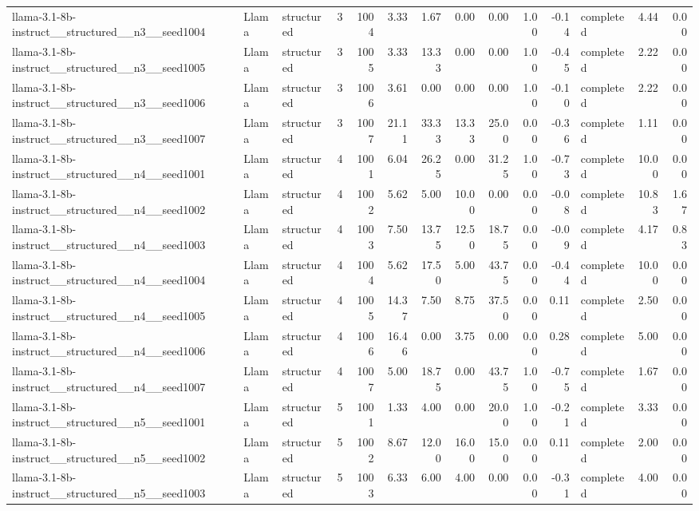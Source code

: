 \begin{longtable}{lllrrrrrrrrlrr}
llama-3.1-8b-instruct\_\_structured\_\_n3\_\_seed1004 & Llama & structured & 3 & 1004 & 3.33 & 1.67 & 0.00 & 0.00 & 1.00 & -0.14 & completed & 4.44 & 0.00 \\
llama-3.1-8b-instruct\_\_structured\_\_n3\_\_seed1005 & Llama & structured & 3 & 1005 & 3.33 & 13.33 & 0.00 & 0.00 & 1.00 & -0.45 & completed & 2.22 & 0.00 \\
llama-3.1-8b-instruct\_\_structured\_\_n3\_\_seed1006 & Llama & structured & 3 & 1006 & 3.61 & 0.00 & 0.00 & 0.00 & 1.00 & -0.10 & completed & 2.22 & 0.00 \\
llama-3.1-8b-instruct\_\_structured\_\_n3\_\_seed1007 & Llama & structured & 3 & 1007 & 21.11 & 33.33 & 13.33 & 25.00 & 0.00 & -0.36 & completed & 1.11 & 0.00 \\
llama-3.1-8b-instruct\_\_structured\_\_n4\_\_seed1001 & Llama & structured & 4 & 1001 & 6.04 & 26.25 & 0.00 & 31.25 & 1.00 & -0.73 & completed & 10.00 & 0.00 \\
llama-3.1-8b-instruct\_\_structured\_\_n4\_\_seed1002 & Llama & structured & 4 & 1002 & 5.62 & 5.00 & 10.00 & 0.00 & 0.00 & -0.08 & completed & 10.83 & 1.67 \\
llama-3.1-8b-instruct\_\_structured\_\_n4\_\_seed1003 & Llama & structured & 4 & 1003 & 7.50 & 13.75 & 12.50 & 18.75 & 0.00 & -0.09 & completed & 4.17 & 0.83 \\
llama-3.1-8b-instruct\_\_structured\_\_n4\_\_seed1004 & Llama & structured & 4 & 1004 & 5.62 & 17.50 & 5.00 & 43.75 & 0.00 & -0.44 & completed & 10.00 & 0.00 \\
llama-3.1-8b-instruct\_\_structured\_\_n4\_\_seed1005 & Llama & structured & 4 & 1005 & 14.37 & 7.50 & 8.75 & 37.50 & 0.00 & 0.11 & completed & 2.50 & 0.00 \\
llama-3.1-8b-instruct\_\_structured\_\_n4\_\_seed1006 & Llama & structured & 4 & 1006 & 16.46 & 0.00 & 3.75 & 0.00 & 0.00 & 0.28 & completed & 5.00 & 0.00 \\
llama-3.1-8b-instruct\_\_structured\_\_n4\_\_seed1007 & Llama & structured & 4 & 1007 & 5.00 & 18.75 & 0.00 & 43.75 & 1.00 & -0.75 & completed & 1.67 & 0.00 \\
llama-3.1-8b-instruct\_\_structured\_\_n5\_\_seed1001 & Llama & structured & 5 & 1001 & 1.33 & 4.00 & 0.00 & 20.00 & 1.00 & -0.21 & completed & 3.33 & 0.00 \\
llama-3.1-8b-instruct\_\_structured\_\_n5\_\_seed1002 & Llama & structured & 5 & 1002 & 8.67 & 12.00 & 16.00 & 15.00 & 0.00 & 0.11 & completed & 2.00 & 0.00 \\
llama-3.1-8b-instruct\_\_structured\_\_n5\_\_seed1003 & Llama & structured & 5 & 1003 & 6.33 & 6.00 & 4.00 & 0.00 & 0.00 & -0.31 & completed & 4.00 & 0.00 \\

\end{longtable}
